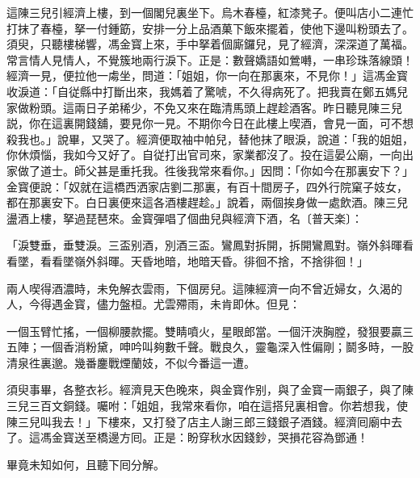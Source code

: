 這陳三兒引經濟上樓，到一個閣兒裏坐下。烏木春檯，紅漆凳子。便叫店小二連忙打抹了春檯，拏一付鍾筯，安排一分上品酒菓下飯來擺着，使他下邊叫粉頭去了。須臾，只聽樓梯響，馮金寳上來，手中拏着個廝鑼兒，見了經濟，深深道了萬福。常言情人見情人，不覺簇地兩行淚下。正是：數聲嬌語如鶯囀，一串珍珠落線頭！經濟一見，便拉他一䖏坐，問道：「姐姐，你一向在那裏來，不見你！」這馮金寳收淚道：「自従縣中打斷出來，我媽着了驚唬，不久得病死了。把我賣在鄭五媽兒家做粉頭。這兩日子弟稀少，不免又來在臨清馬頭上趕趁酒客。昨日聽見陳三兒説，你在這裏開錢舖，要見你一見。不期你今日在此樓上喫酒，會見一面，可不想殺我也。」說畢，又哭了。經濟便取袖中帕兒，替他抹了眼淚，說道：「我的姐姐，你休煩惱，我如今又好了。自従打出官司來，家業都沒了。投在這晏公廟，一向出家做了道士。師父甚是重托我。徃後我常來看你。」因問：「你如今在那裏安下？」金寳便說：「奴就在這橋西洒家店劉二那裏，有百十間房子，四外行院窠子妓女，都在那裏安下。白日裏便來這各酒樓趕趁。」說着，兩個挨身做一處飲酒。陳三兒盪酒上樓，拏過琵琶來。金寳彈唱了個曲兒與經濟下酒，名〔普天楽〕：

\begin{myquote}
「淚雙垂，垂雙淚。三盃别酒，別酒三盃。鸞鳳對拆開，拆開鸞鳳對。嶺外斜暉看看墜，看看墜嶺外斜暉。天昏地暗，地暗天昏。徘徊不捨，不捨徘徊！」
\end{myquote}

兩人喫得酒濃時，未免解衣雲雨，下個房兒。這陳經濟一向不曾近婦女，久渴的人，今得遇金寳，儘力盤桓。尤雲殢雨，未肯即休。但見：

\begin{myquote}
一個玉臂忙搖，一個柳腰款擺。雙睛噴火，星眼郎當。一個汗浹胸膛，發狠要贏三五陣；一個香消粉黛，呻吟叫夠數千聲。戰良久，靈龜深入性偏剛；鬬多時，一股清泉徃裏邈。幾番鏖戰煙蘭妓，不似今番這一遭。
\end{myquote}

須臾事畢，各整衣衫。經濟見天色晚來，與金寳作别，與了金寳一兩銀子，與了陳三兒三百文銅錢。囑咐：「姐姐，我常來看你，咱在這搭兒裏相會。你若想我，使陳三兒叫我去！」下樓來，又打發了店主人謝三郎三錢銀子酒錢。經濟囘廟中去了。這馮金寳送至橋邊方囘。正是：盼穿秋水因錢鈔，哭損花容為鄧通！

畢竟未知如何，且聽下囘分解。

